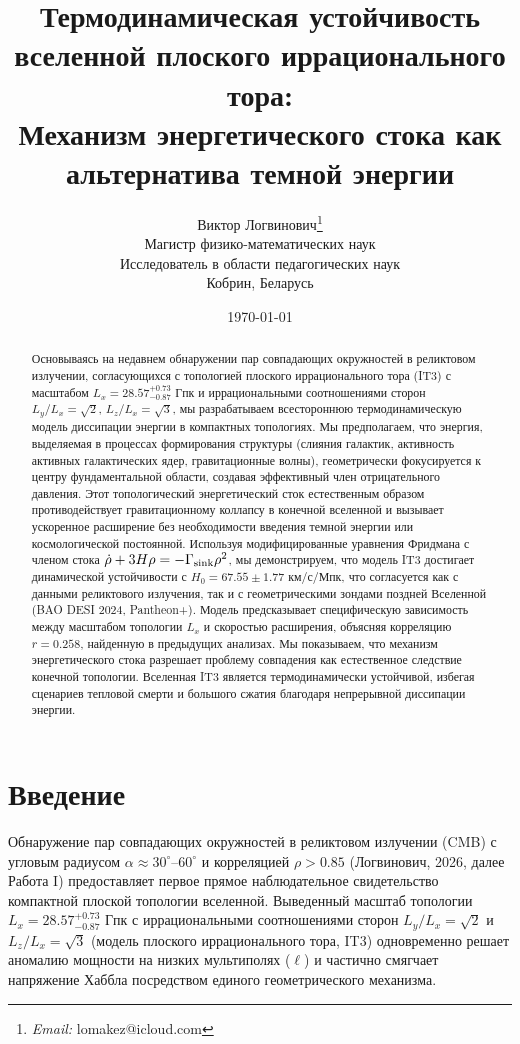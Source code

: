 \documentclass[12pt,a4paper]{article}
\title{\textbf{Термодинамическая устойчивость вселенной плоского иррационального тора:}\\ Механизм энергетического стока как альтернатива темной энергии}
\author{Виктор Логвинович\thanks{\textit{Email:} lomakez@icloud.com}\\
Магистр физико-математических наук\\
Исследователь в области педагогических наук\\
Кобрин, Беларусь}
\date{\today}
\begin{document}
\maketitle

\begin{abstract}
Основываясь на недавнем обнаружении пар совпадающих окружностей в реликтовом излучении, согласующихся с топологией плоского иррационального тора (IT3) с масштабом $L_x = 28.57^{+0.73}_{-0.87}$ Гпк и иррациональными соотношениями сторон $L_y/L_x = \sqrt{2}$, $L_z/L_x = \sqrt{3}$, мы разрабатываем всестороннюю термодинамическую модель диссипации энергии в компактных топологиях. Мы предполагаем, что энергия, выделяемая в процессах формирования структуры (слияния галактик, активность активных галактических ядер, гравитационные волны), геометрически фокусируется к центру фундаментальной области, создавая эффективный член отрицательного давления. Этот топологический энергетический сток естественным образом противодействует гравитационному коллапсу в конечной вселенной и вызывает ускоренное расширение без необходимости введения темной энергии или космологической постоянной. Используя модифицированные уравнения Фридмана с членом стока $\dot{\rho} + 3H\rho = -\Gamma_{\rm sink}\rho^2$, мы демонстрируем, что модель IT3 достигает динамической устойчивости с $H_0 = 67.55 \pm 1.77$ км/с/Мпк, что согласуется как с данными реликтового излучения, так и с геометрическими зондами поздней Вселенной (BAO DESI 2024, Pantheon+). Модель предсказывает специфическую зависимость между масштабом топологии $L_x$ и скоростью расширения, объясняя корреляцию $r = 0.258$, найденную в предыдущих анализах. Мы показываем, что механизм энергетического стока разрешает проблему совпадения как естественное следствие конечной топологии. Вселенная IT3 является термодинамически устойчивой, избегая сценариев тепловой смерти и большого сжатия благодаря непрерывной диссипации энергии.
\end{abstract}

\section{Введение}

Обнаружение пар совпадающих окружностей в реликтовом излучении (CMB) с угловым радиусом $\alpha \approx 30^\circ\text{--}60^\circ$ и корреляцией $\rho > 0.85$ (Логвинович, 2026, далее Работа I) предоставляет первое прямое наблюдательное свидетельство компактной плоской топологии вселенной. Выведенный масштаб топологии $L_x = 28.57^{+0.73}_{-0.87}$ Гпк с иррациональными соотношениями сторон $L_y/L_x = \sqrt{2}$ и $L_z/L_x = \sqrt{3}$ (модель плоского иррационального тора, IT3) одновременно решает аномалию мощности на низких мультиполях ($\ell$) и частично смягчает напряжение Хаббла посредством единого геометрического механизма.
\end{document}
